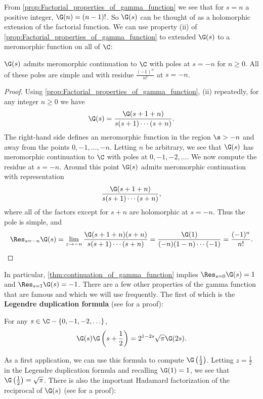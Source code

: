       From \cref{prop:Factorial_properties_of_gamma_function} we see that for $s = n$ a positive integer, $\G(n) = (n-1)!$. So $\G(s)$ can be thought of as a holomorphic extension of the factorial function. We can use property (ii) of \cref{prop:Factorial_properties_of_gamma_function} to extended $\G(s)$ to a meromorphic function on all of $\C$:

      \begin{theorem}\label{thm:continuation_of_gamma_function}
        $\G(s)$ admits meromorphic continuation to $\C$ with poles at $s = -n$ for $n \ge 0$. All of these poles are simple and with residue $\frac{(-1)^{n}}{n!}$ at $s = -n$.
      \end{theorem}
      \begin{proof}
        Using \cref{prop:Factorial_properties_of_gamma_function}, (ii) repeatedly, for any integer $n \ge 0$ we have
        \[
          \G(s) = \frac{\G(s+1+n)}{s(s+1) \cdots (s+n)}.
        \]
        The right-hand side defines an meromorphic function in the region $\s > -n$ and away from the points $0,-1,\ldots,-n$. Letting $n$ be arbitrary, we see that $\G(s)$ has meromorphic continuation to $\C$ with poles at $0,-1,-2,\ldots$. We now compute the residue at $s = -n$. Around this point $\G(s)$ admits meromorphic continuation with representation
        \[
          \frac{\G(s+1+n)}{s(s+1) \cdots (s+n)},
        \]
        where all of the factors except for $s+n$ are holomorphic at $s = -n$. Thus the pole is simple, and
        \[
          \Res_{s = -n}\G(s) = \lim_{z \to -n}\frac{\G(s+1+n)(s+n)}{s(s+1) \cdots (s+n)} = \frac{\G(1)}{(-n)(1-n) \cdots (-1)} = \frac{(-1)^{n}}{n!}.
        \]
      \end{proof}

      In particular, \cref{thm:continuation_of_gamma_function} implies $\Res_{s = 0}\G(s) = 1$ and $\Res_{s = 1}\G(s) = -1$. There are a few other properties of the gamma function that are famous and which we will use frequently. The first of which is the \textbf{Legendre duplication formula} (see \cite{remmert1998classical} for a proof):

      \begin{theorem}
        For any $s \in \C-\{0,-1,-2,\ldots\}$,
        \[
          \G(s)\G\left(s+\frac{1}{2}\right) = 2^{1-2s}\sqrt{\pi}\G(2s).
        \]
      \end{theorem}

      As a first application, we can use this formula to compute $\G\left(\frac{1}{2}\right)$. Letting $z = \frac{1}{2}$ in the Legendre duplication formula and recalling $\G(1) = 1$, we see that $\G\left(\frac{1}{2}\right) = \sqrt{\pi}$. There is also the important Hadamard factorization of the reciprocal of $\G(s)$ (see \cite{stein2003complex} for a proof):

